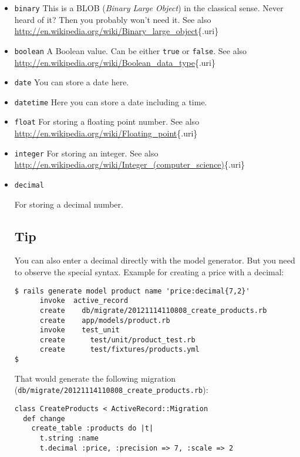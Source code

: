 \documentclass[a4paper]{book}
\newcounter{tab}[chapter]
\begin{document}
\begin{itemize}
\item
  \texttt{binary} This is a BLOB (\emph{Binary Large Object}) in the classical sense. Never heard of it? Then you probably won't need it. See also \url{http://en.wikipedia.org/wiki/Binary_large_object}\{.uri\}
\item
  \texttt{boolean} A Boolean value. Can be either \texttt{true} or \texttt{false}. See also \url{http://en.wikipedia.org/wiki/Boolean_data_type}\{.uri\}
\item
  \texttt{date} You can store a date here.
\item
  \texttt{datetime} Here you can store a date including a time.
\item
  \texttt{float} For storing a floating point number. See also \url{http://en.wikipedia.org/wiki/Floating_point}\{.uri\}
\item
  \texttt{integer} For storing an integer. See also \url{http://en.wikipedia.org/wiki/Integer_(computer_science)}\{.uri\}
\item
  \texttt{decimal}

  For storing a decimal number.

  \subsection{Tip}\label{tip-6}

  You can also enter a decimal directly with the model generator. But you need to observe the special syntax. Example for creating a price with a decimal:

\begin{shaded}\begin{verbatim}
$ rails generate model product name 'price:decimal{7,2}'
      invoke  active_record
      create    db/migrate/20121114110808_create_products.rb
      create    app/models/product.rb
      invoke    test_unit
      create      test/unit/product_test.rb
      create      test/fixtures/products.yml
$
\end{verbatim}\end{shaded}

  That would generate the following migration (\texttt{db/migrate/20121114110808\_create\_products.rb}):

\begin{shaded}\begin{verbatim}
class CreateProducts < ActiveRecord::Migration
  def change
    create_table :products do |t|
      t.string :name
      t.decimal :price, :precision => 7, :scale => 2


\end{verbatim}
\end{shaded}
\end{itemize}
\end{document}
